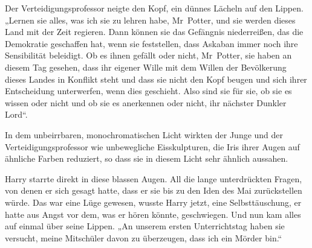 Der Verteidigungsprofessor neigte den Kopf, ein dünnes Lächeln auf den Lippen.
„Lernen sie alles, was ich sie zu lehren habe, Mr~Potter, und sie werden dieses Land mit der Zeit regieren. Dann können sie das Gefängnis niederreißen, das die Demokratie geschaffen hat, wenn sie feststellen, dass Askaban immer noch ihre Sensibilität beleidigt. Ob es ihnen gefällt oder nicht, Mr~Potter, sie haben an diesem Tag gesehen, dass ihr eigener Wille mit dem Willen der Bevölkerung dieses Landes in Konflikt steht und dass sie nicht den Kopf beugen und sich ihrer Entscheidung unterwerfen, wenn dies geschieht. Also sind sie für sie, ob sie es wissen oder nicht und ob sie es anerkennen oder nicht, ihr nächster Dunkler Lord“.

In dem unbeirrbaren, monochromatischen Licht wirkten der Junge und der Verteidigungsprofessor wie unbewegliche Eisskulpturen, die Iris ihrer Augen auf ähnliche Farben reduziert, so dass sie in diesem Licht sehr ähnlich aussahen.

Harry starrte direkt in diese blassen Augen. All die lange unterdrückten Fragen, von denen er sich gesagt hatte, dass er sie bis zu den Iden des Mai zurückstellen würde. Das war eine Lüge gewesen, wusste Harry jetzt, eine Selbsttäuschung, er hatte aus Angst vor dem, was er hören könnte, geschwiegen. Und nun kam alles auf einmal über seine Lippen.
„An unserem ersten Unterrichtstag haben sie versucht, meine Mitschüler davon zu überzeugen, dass ich ein Mörder bin.“

